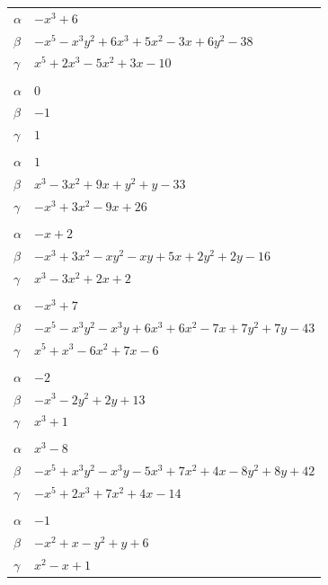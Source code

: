 \documentclass[11pt]{article}
\begin{document}
\begin{longtable}{@{}ll@{}}
$\alpha$ & $-x^{3}+6$\\
$\beta$ & $-x^{5}-x^{3}y^{2}+6x^{3}+5x^{2}-3x+6y^{2}-38$\\
$\gamma$ & $x^{5}+2x^{3}-5x^{2}+3x-10$\\
\addlinespace[3pt]
\multicolumn{2}{@{}l}{$\{i,j\}=\{2,15\}$, $k_{ij}=2$}\\
$\alpha$ & $0$\\
$\beta$ & $-1$\\
$\gamma$ & $1$\\
\addlinespace[3pt]
\multicolumn{2}{@{}l}{$\{i,j\}=\{3,17\}$, $k_{ij}=2^{2}\cdot 3\cdot 7$}\\
$\alpha$ & $1$\\
$\beta$ & $x^{3}-3x^{2}+9x+y^{2}+y-33$\\
$\gamma$ & $-x^{3}+3x^{2}-9x+26$\\
\addlinespace[3pt]
\multicolumn{2}{@{}l}{$\{i,j\}=\{3,25\}$, $k_{ij}=2\cdot 7$}\\
$\alpha$ & $-x+2$\\
$\beta$ & $-x^{3}+3x^{2}-xy^{2}-xy+5x+2y^{2}+2y-16$\\
$\gamma$ & $x^{3}-3x^{2}+2x+2$\\
\addlinespace[3pt]
\multicolumn{2}{@{}l}{$\{i,j\}=\{3,29\}$, $k_{ij}=2^{4}\cdot 3$}\\
$\alpha$ & $-x^{3}+7$\\
$\beta$ & $-x^{5}-x^{3}y^{2}-x^{3}y+6x^{3}+6x^{2}-7x+7y^{2}+7y-43$\\
$\gamma$ & $x^{5}+x^{3}-6x^{2}+7x-6$\\
\addlinespace[3pt]
\multicolumn{2}{@{}l}{$\{i,j\}=\{4,19\}$, $k_{ij}=2^{4}$}\\
$\alpha$ & $-2$\\
$\beta$ & $-x^{3}-2y^{2}+2y+13$\\
$\gamma$ & $x^{3}+1$\\
\addlinespace[3pt]
\multicolumn{2}{@{}l}{$\{i,j\}=\{4,23\}$, $k_{ij}=2^{2}\cdot 3^{2}$}\\
$\alpha$ & $x^{3}-8$\\
$\beta$ & $-x^{5}+x^{3}y^{2}-x^{3}y-5x^{3}+7x^{2}+4x-8y^{2}+8y+42$\\
$\gamma$ & $-x^{5}+2x^{3}+7x^{2}+4x-14$\\
\addlinespace[3pt]
\multicolumn{2}{@{}l}{$\{i,j\}=\{4,31\}$, $k_{ij}=2^{3}$}\\
$\alpha$ & $-1$\\
$\beta$ & $-x^{2}+x-y^{2}+y+6$\\
$\gamma$ & $x^{2}-x+1$\\

\end{longtable}
\end{document}
